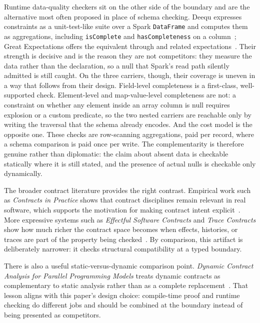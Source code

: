Runtime data-quality checkers sit on the other side of the boundary and are the alternative most often proposed in place of schema checking. Deequ expresses constraints as a unit-test-like suite over a Spark \texttt{DataFrame} and computes them as aggregations, including \texttt{isComplete} and \texttt{hasCompleteness} on a column~\cite{deequ}; Great Expectations offers the equivalent through  and related expectations~\cite{great_expectations}. Their strength is decisive and is the reason they are not competitors: they measure the data rather than the declaration, so a null that Spark's read path silently admitted is still caught. On the three carriers, though, their coverage is uneven in a way that follows from their design. Field-level completeness is a first-class, well-supported check. Element-level and map-value-level completeness are not: a constraint on whether any element inside an array column is null requires explosion or a custom predicate, so the two nested carriers are reachable only by writing the traversal that the schema already encodes. And the cost model is the opposite one. These checks are row-scanning aggregations, paid per record, where a schema comparison is paid once per write. The complementarity is therefore genuine rather than diplomatic: the claim about absent data is checkable statically where it is still stated, and the presence of actual nulls is checkable only dynamically.

The broader contract literature provides the right contrast. Empirical work such as \emph{Contracts in Practice} shows that contract disciplines remain relevant in real software, which supports the motivation for making contract intent explicit~\cite{contracts_in_practice}. More expressive systems such as \emph{Effectful Software Contracts} and \emph{Trace Contracts} show how much richer the contract space becomes when effects, histories, or traces are part of the property being checked~\cite{effectful_software_contracts,trace_contracts}. By comparison, this artifact is deliberately narrower: it checks structural compatibility at a typed boundary.

There is also a useful static-versus-dynamic comparison point. \emph{Dynamic Contract Analysis for Parallel Programming Models} treats dynamic contracts as complementary to static analysis rather than as a complete replacement~\cite{dynamic_contract_analysis}. That lesson aligns with this paper's design choice: compile-time proof and runtime checking do different jobs and should be combined at the boundary instead of being presented as competitors.

